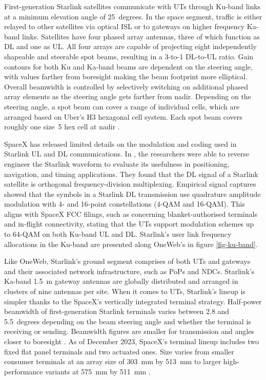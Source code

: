 \documentclass[english, 12pt, a4paper, elec, utf8, a-1b, online]{aaltothesis}
\begin{document}
First-generation Starlink satellites communicate with UTs through Ku-band links at a minimum elevation angle of 25~degrees.
In the space segment, traffic is either relayed to other satellites via optical ISL or to gateways on higher frequency Ka-band links.
Satellites have four phased array antennas, three of which function as DL and one as UL.
All four arrays are capable of projecting eight independently shapeable and steerable spot beams, resulting in a 3-to-1 DL-to-UL ratio.
Gain contours for both Ku and Ka-band beams are dependent on the steering angle, with values farther from boresight making the beam footprint more elliptical.
Overall beamwidth is controlled by selectively switching on additional phased array elements as the steering angle gets farther from nadir. Depending on the steering angle, a spot beam can cover a range of individual cells, which are arranged based on Uber's H3 hexagonal cell system. Each spot beam covers roughly one size~5 hex cell at nadir \cite{spacex2016loa, spacex2020mod}.

SpaceX has released limited details on the modulation and coding used in Starlink UL and DL communications. In \cite{humphreys2023signal}, the researchers were able to reverse engineer the Starlink waveform to evaluate its usefulness in positioning, navigation, and timing applications. They found that the DL signal of a Starlink satellite is orthogonal frequency-division multiplexing. Empirical signal captures showed that the symbols in a Starlink DL transmission use quadrature amplitude modulation with 4- and 16-point constellations (4-QAM and 16-QAM). This aligns with SpaceX FCC filings, such as \cite{SpaceX-SES-AMD-20210731-01295} concerning blanket-authorised terminals and in-flight connectivity, stating that the UTs support modulation schemes up to 64-QAM on both Ku-band UL and DL.
Starlink's user link frequency allocations in the Ku-band are presented along OneWeb's in figure \ref{fig-ku-band}.

Like OneWeb, Starlink's ground segment comprises of both UTs and gateways and their associated network infrastructure, such as PoPs and NDCs. Starlink's Ka-band \qty{1.5}{\meter} gateway antennas are globally distributed and arranged in clusters of nine antennas per site.
When it comes to UTs, Starlink's lineup is simpler thanks to the SpaceX's vertically integrated terminal strategy.
Half-power beamwidth of first-generation Starlink terminals varies between 2.8 and 5.5~degrees depending on the beam steering angle and whether the terminal is receiving or sending. Beamwidth figures are smaller for transmission and angles closer to boresight \cite{SpaceX-SES-AMD-20210731-01295}. As of December 2023, SpaceX's terminal lineup includes two fixed flat panel terminals and two actuated ones. Size varies from smaller consumer terminals at an array size of \qty{303}{\milli\meter} by \qty{513}{\milli\meter} to larger high-performance variants at \qty{575}{\milli\meter} by \qty{511}{\milli\meter} \cite{starlink-terminal-specs}.
\end{document}
